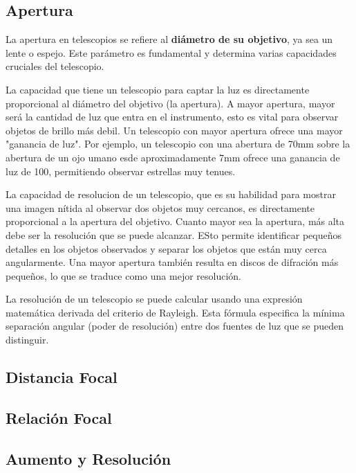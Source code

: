 \subsection{Apertura}
\label{subsec:apertura}

La apertura en telescopios se refiere al \textbf{diámetro de su objetivo}, ya sea un lente o espejo. Este parámetro es fundamental y determina varias capacidades cruciales del telescopio. 

La capacidad que tiene un telescopio para captar la luz es directamente proporcional al diámetro del objetivo (la apertura). A mayor apertura, mayor será la cantidad de luz que entra en el instrumento, esto es vital para observar objetos de brillo más debil. Un telescopio con mayor apertura ofrece una mayor "ganancia de luz". Por ejemplo, un telescopio con una abertura de 70mm sobre la abertura de un ojo umano esde aproximadamente 7mm ofrece una ganancia de luz de 100, permitiendo observar estrellas muy tenues.

La capacidad de resolucion de un telescopio, que es su habilidad para mostrar una imagen nítida al observar dos objetos muy cercanos, es directamente proporcional a la apertura del objetivo. Cuanto mayor sea la apertura, más alta debe ser la resolución que se puede alcanzar. ESto permite identificar pequeños detalles en los objetos observados y separar los objetos que están muy cerca angularmente. Una mayor apertura también resulta en discos de difración más pequeños, lo que se traduce como una mejor resolución.

La resolución de un telescopio se puede calcular usando una expresión matemática derivada del criterio de Rayleigh. Esta fórmula especifica la mínima separación angular (poder de resolución) entre dos fuentes de luz que se pueden distinguir. 



\subsection{Distancia Focal}
\label{subsec:dist_focal}

\subsection{Relación Focal}
\label{subsec:rel_focal}

\subsection{Aumento y Resolución}
\label{subse:aumento_resolucion}


